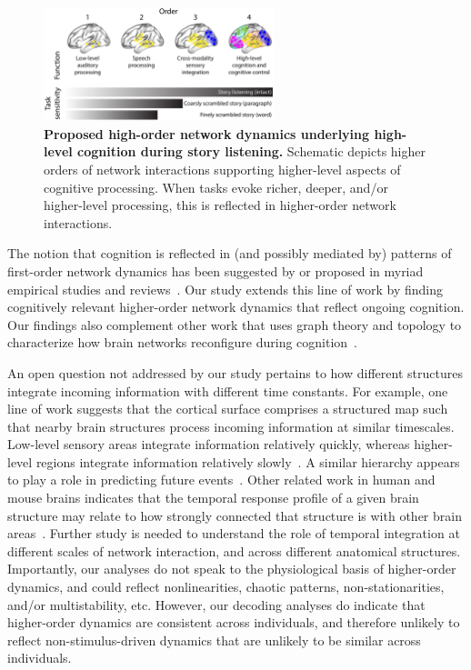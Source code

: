 \documentclass[english]{article}
\begin{document}
\begin{figure}[tp]
  \centering
  \includegraphics[width=0.6\textwidth]{figs/discussion}
  \caption{\textbf{Proposed high-order network dynamics underlying
       high-level cognition during story listening.}  Schematic depicts
    higher orders of
    network interactions supporting higher-level aspects of cognitive
    processing.  When tasks evoke richer, deeper, and/or higher-level
    processing, this is reflected in higher-order network
    interactions.}
  \label{fig:discussion}
\end{figure}

The notion that cognition is reflected in (and possibly mediated by)
patterns of first-order network dynamics has been suggested by or
proposed in myriad empirical studies and
reviews~\citep[e.g.,][]{DemeEtal19, Turk13, LuriEtal18, FongEtal19,
  ParkEtal18b, PretEtal17, MannEtal18, RoyEtal19, LiegEtal19, ZouEtal19,
  ChanGlov10, GonzEtal19, McIn00, BresKels01}.  Our study extends this line of work by
finding cognitively relevant higher-order network dynamics
that reflect ongoing cognition.  Our findings also complement other work
that uses graph theory and topology to characterize how brain networks
reconfigure during cognition~\citep[e.g.,][]{BassEtal06, ZhenEtal19,
  McInJirs19, TokeSomm19, SizeEtal18, ReimEtal17, BetzEtal19}.

An open question not addressed by our study pertains to how different
structures integrate incoming information with different time
constants.  For example, one line of work suggests that the cortical
surface comprises a structured map such that nearby brain structures
process incoming information at similar timescales.  Low-level sensory
areas integrate information relatively quickly, whereas higher-level
regions integrate information relatively slowly~\citep{BaldEtal17,
  HassEtal08, HassEtal15, HoneEtal12a, LernEtal11, LernEtal14,
  ChieHone19}.  A similar hierarchy appears to play a role in
predicting future events~\citep{LeeEtal20}.  Other related work in
human and mouse brains indicates that the temporal response profile of
a given brain structure may relate to how strongly connected that
structure is with other brain areas~\citep{FallEtal20}.  Further study
is needed to understand the role of temporal integration at different
scales of network interaction, and across different anatomical
structures. Importantly, our analyses do not speak to the
physiological basis of higher-order dynamics, and could reflect
nonlinearities, chaotic patterns, non-stationarities, and/or
multistability, etc. However, our decoding analyses do indicate that
higher-order dynamics are consistent across individuals, and therefore
unlikely to reflect non-stimulus-driven dynamics that are unlikely to
be similar across individuals.
\end{document}
